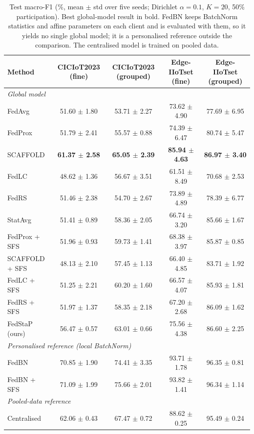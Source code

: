 \begin{table}[t]
\centering
\caption{Test macro-F1 (\%, mean $\pm$ std over five seeds; Dirichlet $\alpha=0.1$, $K=20$, 50\% participation). Best global-model result in bold. FedBN keeps BatchNorm statistics and affine parameters on each client and is evaluated with them, so it yields no single global model; it is a personalised reference outside the comparison. The centralised model is trained on pooled data.}
\label{tab:main}
\small
\begin{tabular}{lcccc}
\toprule
Method & CICIoT2023 (fine) & CICIoT2023 (grouped) & Edge-IIoTset (fine) & Edge-IIoTset (grouped) \\
\midrule
\multicolumn{5}{l}{\textit{Global model}} \\
FedAvg & 51.60 $\pm$ 1.80 & 53.71 $\pm$ 2.27 & 73.62 $\pm$ 4.90 & 77.69 $\pm$ 6.95 \\
FedProx & 51.79 $\pm$ 2.41 & 55.57 $\pm$ 0.88 & 74.39 $\pm$ 6.47 & 80.74 $\pm$ 5.47 \\
SCAFFOLD & \textbf{61.37 $\pm$ 2.58} & \textbf{65.05 $\pm$ 2.39} & \textbf{85.94 $\pm$ 4.63} & \textbf{86.97 $\pm$ 3.40} \\
FedLC & 48.62 $\pm$ 1.36 & 56.67 $\pm$ 3.51 & 61.51 $\pm$ 8.49 & 70.68 $\pm$ 2.53 \\
FedRS & 51.46 $\pm$ 2.38 & 54.70 $\pm$ 2.67 & 73.89 $\pm$ 4.89 & 78.39 $\pm$ 6.77 \\
StatAvg & 51.41 $\pm$ 0.89 & 58.36 $\pm$ 2.05 & 66.74 $\pm$ 3.20 & 85.66 $\pm$ 1.67 \\
FedProx + SFS & 51.96 $\pm$ 0.93 & 59.73 $\pm$ 1.41 & 68.38 $\pm$ 3.97 & 85.87 $\pm$ 0.85 \\
SCAFFOLD + SFS & 48.13 $\pm$ 2.10 & 57.45 $\pm$ 1.13 & 66.40 $\pm$ 4.85 & 83.71 $\pm$ 1.92 \\
FedLC + SFS & 51.25 $\pm$ 2.21 & 60.20 $\pm$ 1.60 & 66.57 $\pm$ 4.07 & 85.93 $\pm$ 1.81 \\
FedRS + SFS & 51.97 $\pm$ 1.37 & 58.35 $\pm$ 2.18 & 67.20 $\pm$ 2.68 & 86.09 $\pm$ 1.62 \\
FedStaP (ours) & 56.47 $\pm$ 0.57 & 63.01 $\pm$ 0.66 & 75.56 $\pm$ 4.38 & 86.60 $\pm$ 2.25 \\
\midrule
\multicolumn{5}{l}{\textit{Personalised reference (local BatchNorm)}} \\
FedBN & 70.85 $\pm$ 1.90 & 74.41 $\pm$ 3.35 & 93.71 $\pm$ 1.78 & 96.35 $\pm$ 0.81 \\
FedBN + SFS & 71.09 $\pm$ 1.99 & 75.66 $\pm$ 2.01 & 93.82 $\pm$ 1.41 & 96.34 $\pm$ 1.14 \\
\midrule
\multicolumn{5}{l}{\textit{Pooled-data reference}} \\
Centralised & 62.06 $\pm$ 0.43 & 67.47 $\pm$ 0.72 & 88.62 $\pm$ 0.25 & 95.49 $\pm$ 0.24 \\
\bottomrule
\end{tabular}
\end{table}
